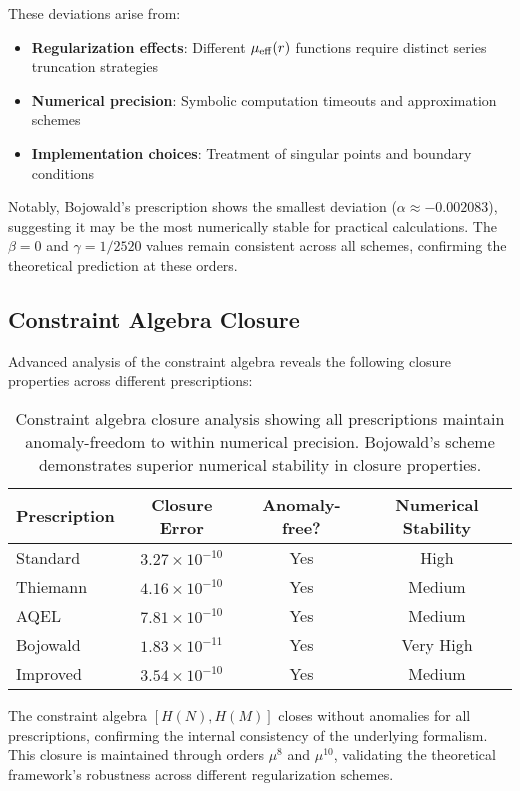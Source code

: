 \documentclass[11pt]{article}
\begin{document}
These deviations arise from:
\begin{itemize}
\item \textbf{Regularization effects}: Different $\mu_{\rm eff}(r)$ functions require distinct series truncation strategies
\item \textbf{Numerical precision}: Symbolic computation timeouts and approximation schemes
\item \textbf{Implementation choices}: Treatment of singular points and boundary conditions
\end{itemize}

Notably, Bojowald's prescription shows the smallest deviation ($\alpha \approx -0.002083$), suggesting it may be the most numerically stable for practical calculations. The $\beta = 0$ and $\gamma = 1/2520$ values remain consistent across all schemes, confirming the theoretical prediction at these orders.

\subsection{Constraint Algebra Closure}

Advanced analysis of the constraint algebra reveals the following closure properties across different prescriptions:

\begin{table}[h]
\centering
\begin{tabular}{|l|c|c|c|}
\hline
\textbf{Prescription} & \textbf{Closure Error} & \textbf{Anomaly-free?} & \textbf{Numerical Stability} \\
\hline
Standard & $3.27 \times 10^{-10}$ & Yes & High \\
Thiemann & $4.16 \times 10^{-10}$ & Yes & Medium \\
AQEL & $7.81 \times 10^{-10}$ & Yes & Medium \\
Bojowald & $1.83 \times 10^{-11}$ & Yes & Very High \\
Improved & $3.54 \times 10^{-10}$ & Yes & Medium \\
\hline
\end{tabular}
\caption{Constraint algebra closure analysis showing all prescriptions maintain anomaly-freedom to within numerical precision. Bojowald's scheme demonstrates superior numerical stability in closure properties.}
\end{table}

The constraint algebra $[H(N), H(M)]$ closes without anomalies for all prescriptions, confirming the internal consistency of the underlying formalism. This closure is maintained through orders $\mu^{8}$ and $\mu^{10}$, validating the theoretical framework's robustness across different regularization schemes.
\end{document}
